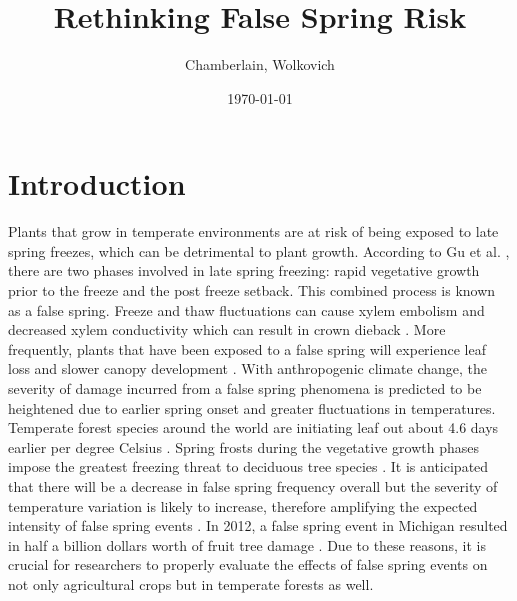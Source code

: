 \documentclass{article}\usepackage[]{graphicx}\usepackage[]{color}
\begin{document}
\title{Rethinking False Spring Risk}
\author{Chamberlain, Wolkovich}
\date{\today}
\maketitle 
\newpage
\tableofcontents
\listoffigures
\listoftables

\renewcommand{\thetable}{\arabic{table}}
\renewcommand{\thefigure}{\arabic{figure}}
\renewcommand{\labelitemi}{$-$}

\newpage
\section{Introduction}
Plants that grow in temperate environments are at risk of being exposed to late spring freezes, which can be detrimental to plant growth. According to Gu et al. \citeyear{Gu2008}, there are two phases involved in late spring freezing: rapid vegetative growth prior to the freeze and the post freeze setback. This combined process is known as a false spring. Freeze and thaw fluctuations can cause xylem embolism and decreased xylem conductivity which can result in crown dieback \citep{Gu2008}.
More frequently, plants that have been exposed to a false spring will experience leaf loss and slower canopy development \citep{Hufkens2012}. 
With anthropogenic climate change, the severity of damage incurred from a false spring phenomena is predicted to be heightened due to earlier spring onset and greater fluctuations in temperatures. Temperate forest species around the world are initiating leaf out about 4.6 days earlier per degree Celsius \citep{Polgar2014, Wolkovich2012}. Spring frosts during the vegetative growth phases impose the greatest freezing threat to deciduous tree species \citep{Sakai1987}. It is anticipated that there will be a decrease in false spring frequency overall but the severity of temperature variation is likely to increase, therefore amplifying the expected intensity of false spring events \citep{Allstadt2015}. In 2012, a false spring event in Michigan resulted in half a billion dollars worth of fruit tree damage \citep{Ault2013, Knudson2012}. Due to these reasons, it is crucial for researchers to properly evaluate the effects of false spring events on not only agricultural crops but in temperate forests as well.
\end{document}
